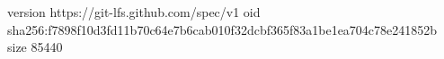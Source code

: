 version https://git-lfs.github.com/spec/v1
oid sha256:f7898f10d3fd11b70c64e7b6cab010f32dcbf365f83a1be1ea704c78e241852b
size 85440

